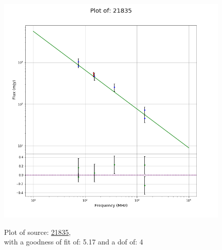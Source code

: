 \documentclass{article}
\begin{document}
\begin{figure}[H]
\begin{minipage}{0.5\textwidth}
        \includegraphics[scale = 0.35]{KmeulenTrap4P23_1min/1min21835.png}
        \captionsetup{labelformat=empty}
        \caption{Plot of source: \href{http://banana.transientskp.org/r4/vlo_KmeulenTrap4P23/runningcatalog/21835}{21835},\\with a goodness of fit of: 5.17 and a dof of: 4}
    \addtocounter{figure}{-1}
    \label{KmeulenTrap4P23:1min:21835:plot}
    \end{minipage}
\end{figure}
\newpage
\end{document}
